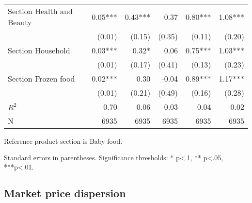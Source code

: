 \documentclass[english]{article}
\begin{document}
\begin{table}[htbp]
\begin{threeparttable}
\begin{tabular}{lrrrrr}
Section Health and Beauty                & 0.05***  & 0.43***  & 0.37     & 0.80***  & 1.08***   \\
                                         & (0.01)   & (0.15)   & (0.35)   & (0.11)   & (0.20)    \\
Section Household                        & 0.03***  & 0.32*    & 0.06     & 0.75***  & 1.03***   \\
                                         & (0.01)   & (0.17)   & (0.41)   & (0.13)   & (0.23)    \\
Section Frozen food                      & 0.02***  & 0.30     & -0.04    & 0.89***  & 1.17***   \\
                                         & (0.01)   & (0.21)   & (0.49)   & (0.16)   & (0.28)    \\
\midrule
$R^2$                                       & 0.70     & 0.06     & 0.03     & 0.04     & 0.02      \\
N                                        & 6935     & 6935     & 6935     & 6935     & 6935      \\
\bottomrule
\bottomrule
\end{tabular}
\begin{tablenotes}
      \small
      \item Reference product section is Baby food.
	  \item Standard errors in parentheses. Significance thresholds: * p<.1, ** p<.05, ***p<.01.
\end{tablenotes}
\end{threeparttable}
\end{table}

\subsection{Market price dispersion}
\end{document}
